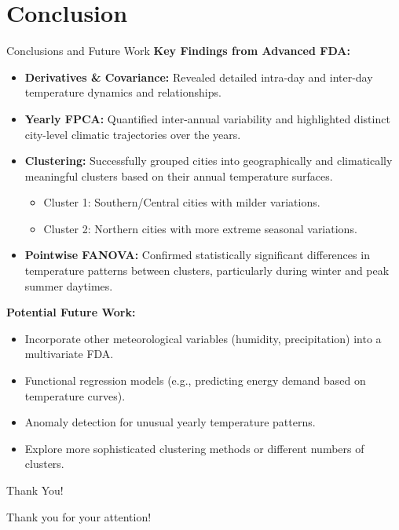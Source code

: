 \documentclass[svgnames, 12pt]{beamer}
\begin{document}
\section{Conclusion}
\begin{frame}{Conclusions and Future Work}
  \textbf{Key Findings from Advanced FDA:}
  \begin{itemize}
    \item \textbf{Derivatives \& Covariance:} Revealed detailed intra-day and inter-day temperature dynamics and relationships.
    \item \textbf{Yearly FPCA:} Quantified inter-annual variability and highlighted distinct city-level climatic trajectories over the years.
    \item \textbf{Clustering:} Successfully grouped cities into geographically and climatically meaningful clusters based on their annual temperature surfaces.
        \begin{itemize}
            \item Cluster 1: Southern/Central cities with milder variations.
            \item Cluster 2: Northern cities with more extreme seasonal variations.
        \end{itemize}
    \item \textbf{Pointwise FANOVA:} Confirmed statistically significant differences in temperature patterns between clusters, particularly during winter and peak summer daytimes.
  \end{itemize}
  \pause
  \textbf{Potential Future Work:}
  \begin{itemize}
    \item Incorporate other meteorological variables (humidity, precipitation) into a multivariate FDA.
    \item Functional regression models (e.g., predicting energy demand based on temperature curves).
    \item Anomaly detection for unusual yearly temperature patterns.
    \item Explore more sophisticated clustering methods or different numbers of clusters.
  \end{itemize}
\end{frame}

\begin{frame}{Thank You!}
	\begin{center}
		\Huge Thank you for your attention!
	\end{center}
\end{frame}
\end{document}
